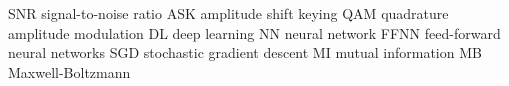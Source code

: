 \makeglossaries %
%
%
%
%
%
%
 {SNR} {signal-to-noise ratio}
%
 {ASK} {amplitude shift keying}
%
 {QAM} {quadrature amplitude modulation}
%
 {DL} {deep learning}
%
 {NN} {neural network}
%
 {FFNN} {feed-forward neural networks}
%
 {SGD} {stochastic gradient descent}
%
 {MI} {mutual information}
%
 {MB} {Maxwell-Boltzmann}